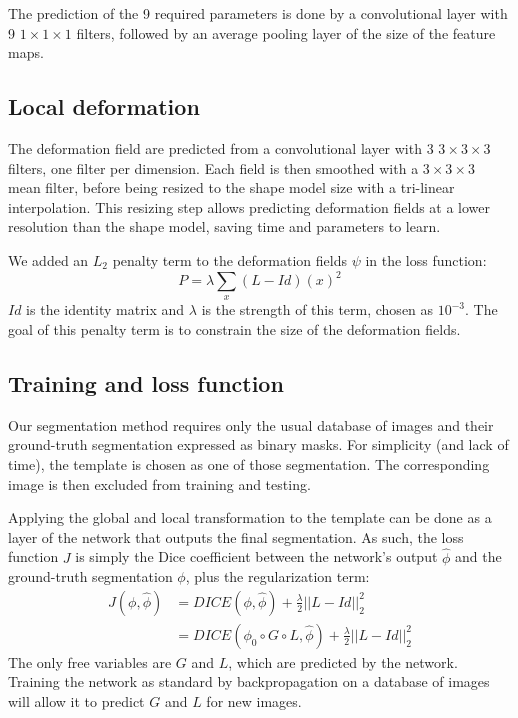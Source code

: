 The prediction of the 9 required parameters is done by a convolutional layer with 9 $1 \times 1 \times 1$ filters, followed by an average pooling layer of the size of the feature maps. 

\subsection{Local deformation}
\label{ssec:seg_local}

The deformation field are predicted from a convolutional layer with 3 $3 \times 3 \times 3$ filters, one filter per dimension. Each field is then smoothed with a $3 \times 3 \times 3$ mean filter, before being resized to the shape model size with a tri-linear interpolation. This resizing step allows predicting deformation fields at a lower resolution than the shape model, saving time and parameters to learn.

We added an $L_2$ penalty term to the deformation fields $\psi$ in the loss function:
\begin{equation}
    P = \lambda \sum_x \left( L - Id \right)(x)^2
\end{equation}
$Id$ is the identity matrix and $\lambda$ is the strength of this term, chosen as $10^{-3}$. The goal of this penalty term is to constrain the size of the deformation fields.

\subsection{Training and loss function}
\label{ssec:seg_training}

Our segmentation method requires only the usual database of images and their ground-truth segmentation expressed as binary masks. For simplicity (and lack of time), the template is chosen as one of those segmentation. The corresponding image is then excluded from training and testing. 

Applying the global and local transformation to the template can be done as a layer of the network that outputs the final segmentation. As such, the loss function $J$ is simply the Dice coefficient between the network's output $\hat{\phi}$ and the ground-truth segmentation $\phi$, plus the regularization term:
\begin{align}
    J \left( \phi, \hat{\phi} \right) &= DICE \left( \phi, \hat{\phi} \right) + \frac{\lambda}{2} || L - Id ||^2_2 \\
                                      &= DICE \left( \phi_0 \circ G \circ L, \hat{\phi} \right) + \frac{\lambda}{2} || L - Id ||^2_2
\end{align}
The only free variables are $G$ and $L$, which are predicted by the network. Training the network as standard by backpropagation on a database of images will allow it to predict $G$ and $L$ for new images. 

